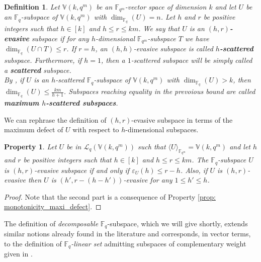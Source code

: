 \documentclass[11pt]{amsart}
\newtheorem{definition}[theorem]{Definition}
\newtheorem{property}[theorem]{Property}
\newcommand{\fqm}{\mathbb{F}_{q^m}}
\newcommand{\F}{{\mathbb F}}
\newcommand{\fq}{{\mathbb F}_{q}}
\begin{document}
\begin{definition}
    Let $\mathbb{V}(k,q^m)$ be an $\F_{q^m}$-vector space of dimension $k$ and let $U$ be an $\fq$-subspace of $\mathbb{V}(k,q^m)$ with $\dim_{\fq} (U)=n$. Let $h$ and $r$ be positive integers such that $h \in [k]$ and $h \leq r \leq km$. We say that $U$ is an $(h,r)$\textbf{-evasive} subspace if for any $h$-dimensional $\fqm$-subspace $T$ we have $\dim_{\fq}(U\cap T)\leq r$. If $r=h$, an $(h,h)$-evasive subspace is called \textbf{$h$-scattered} subspace. Furthermore, if $h=1$, then a $1$-scattered subspace will be simply called a \textbf{scattered} subspace.\\
    By \cite[Theorem 2.3]{csajbok2021generalising}, if $U$ is an $h$-scattered  $\fq$-subspace of $\mathbb{V}(k,q^m)$ with $\dim_{\fq}(U) >k$, then  $\dim_{\fq}(U) \leq \frac{km}{h+1}$. Subspaces reaching equality in the prevoious bound are called {\bf maximum $h$-scattered subspaces}.
\end{definition}

We can rephrase the definition of $(h,r)$-evasive subspace in terms of the maximum defect of $U$ with respect to $h$-dimensional subspaces.

\begin{property} \label{prop:(h,r)-evasive-defect}
Let $U$ be in $\mathcal{L}_q(\mathbb{V}(k,q^m))$ such that $\langle U\rangle_{\fqm}=\mathbb{V}(k,q^m)$ and let $h$ and $r$ be positive integers such that $h \in [k]$ and $h \leq r \leq km$. The $\fq$-subspace $U$ is $(h,r)$-evasive subspace if and only if $\varepsilon_U(h)\leq r-h$. Also, if $U$ is $(h,r)$-evasive then $U$ is $(h',r-(h-h'))$-evasive for any $1\leq h'\leq h$. 
\end{property}
\begin{proof}
    Note that the second part is a consequence of Property \ref{prop: monotonicity_maxi_defect}.
\end{proof}

The definition of {\it decomposable} $\fq$-subspace, which we will give shortly, extends similar notions already found in the literature and corresponds, in vector terms, to the definition of {\it $\fq$-linear set} admitting subspaces of complementary weight given in \cite{adriaensen2023minimum,napolitano2022linear,zullo2023multi,bartoli2024Exceptional_sequences}.
\end{document}
